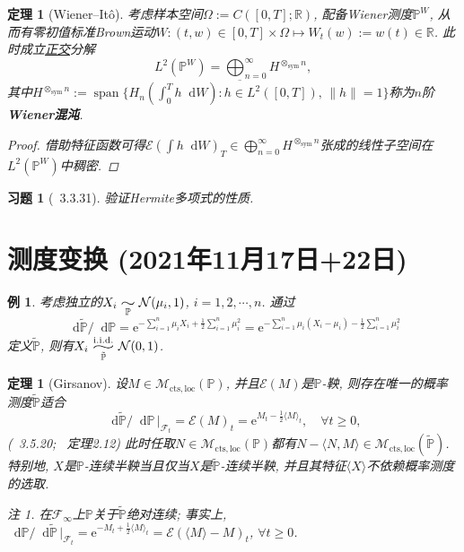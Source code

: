 \documentclass{ctexart}
\theoremstyle{definition}
\theoremstyle{remark}
\newtheorem{Rmk}[Def]{注}
\theoremstyle{plain}
\newtheorem{Thm}[Def]{定理}
\newtheorem{Eg}[Def]{例}
\newtheorem{Ex}{习题}[section]
\newcommand{\widesim}[2][1.5]{\mathrel{\overset{#2}{\scalebox{#1}[1]{$\sim$}}}}
\newcommand{\iidsim}{\widesim[2.33]{\mathrm{i.i.d.}}}	%
\newcommand{\N}{\mathcal{N}}				%
\newcommand{\1}{\mathbbm{1}}				%
\renewcommand{\P}{\mathbb{P}}				%
\newcommand{\agp}[1]{\langle #1 \rangle}	%
\newcommand{\cl}[1]{\overline{#1}}				%
\newcommand{\norm}[1]{\lVert#1\rVert}
\newcommand{\vspan}[1]{\operatorname{span}#1}	%
\newcommand{\R}{\mathbb{R}}					%
\renewcommand*{\d}{\mathop{}\!\mathrm{d}}	%
\newcommand{\e}{\mathrm{e}}
\begin{document}
\begin{Thm}[Wiener--It\^{o}]
考虑样本空间$\Omega := C([0,T];\R)$, 配备Wiener测度$\P^{W}$, 从而有零初值标准Brown运动$W : (t,w) \in [0,T]\times\Omega \mapsto W_{t}(w) := w(t) \in \R$. 此时成立\underline{正交}\:\!分解
\[\textstyle L^{2}(\P^{W}) = \bigoplus_{n=0}^{\infty} H^{\otimes_{\mathrm{sym}}n} , \]
其中$H^{\otimes_{\mathrm{sym}}n} := \cl{\vspan{\{ H_{n}(\int_{0}^{T} h \d W) : h \in L^{2}([0,T]) ,\, \norm{h} = 1 \}}}$称为$n$阶\textbf{Wiener混沌}.
\begin{proof}
借助特征函数可得$\mathcal{E}(\int h \d W)_{T} \in \bigoplus_{n=0}^{\infty} H^{\otimes_{\mathrm{sym}}n}$张成的线性子空间在$L^{2}(\P^{W})$中稠密.
\end{proof}
\end{Thm}


\begin{Ex}[\cite{Karatzas-Shreve--GTM113}~3.3.31]
验证Hermite多项式的性质.
\end{Ex}



\section{测度变换 \normalfont\footnotesize (2021年11月17日+22日)}
\begin{Eg}
考虑独立的$X_{i} \underset{\P}{\widesim{}} \N(\mu_{i},1)$, $i = 1,2,\cdots,n$. 通过\[ \d\tilde{\P}/\d\P = \e^{-\sum_{i=1}^{n}\mu_{i}X_{i}+\frac{1}{2}\sum_{i=1}^{n}\mu_{i}^{2}} = \e^{-\sum_{i=1}^{n}\mu_{i}(X_{i}-\mu_{i})-\frac{1}{2}\sum_{i=1}^{n}\mu_{i}^{2}} \]定义$\tilde{\P}$, 则有$X_{i} \underset{\tilde{\P}}{\iidsim} \N(0,1)$.
\end{Eg}

\begin{Thm}[Girsanov]\label{Thm:Girsanov}
设$M \in \mathcal{M}_{\mathrm{cts},\mathrm{loc}}(\P)$, 并且$\mathcal{E}(M)$是$\P$-鞅, 则存在唯一的概率测度$\tilde{\P}$适合
\[ \d\tilde{\P}/\d\P \,\big|_{\mathscr{F}_{t}} = \mathcal{E}(M)_{t} = \e^{M_{t}-\frac{1}{2}\agp{M}_{t}} ,\quad \forall t \ge 0 , \]
{\normalfont (\cite{Karatzas-Shreve--GTM113}~3.5.20; \cite{龚光鲁-钱敏平}~定理2.12)} 此时任取$N \in \mathcal{M}_{\mathrm{cts},\mathrm{loc}}(\P)$都有$N-\agp{N,M} \in \mathcal{M}_{\mathrm{cts},\mathrm{loc}}(\tilde{\P})$. \\
特别地, $X$是$\P$-连续半鞅当且仅当$X$是$\tilde{\P}$-连续半鞅, 并且其特征$\agp{X}$不依赖概率测度的选取.
\begin{Rmk}
在$\mathscr{F}_{\infty}$上$\P$关于$\tilde{\P}$绝对连续; 事实上, $\d\P/\d\tilde{\P} \,\big|_{\mathscr{F}_{t}} = \e^{-M_{t}+\frac{1}{2}\agp{M}_{t}} = \mathcal{E}(\agp{M}-M)_{t}$, $\forall t \ge 0$.
\end{Rmk}
\end{Thm}
\end{document}
